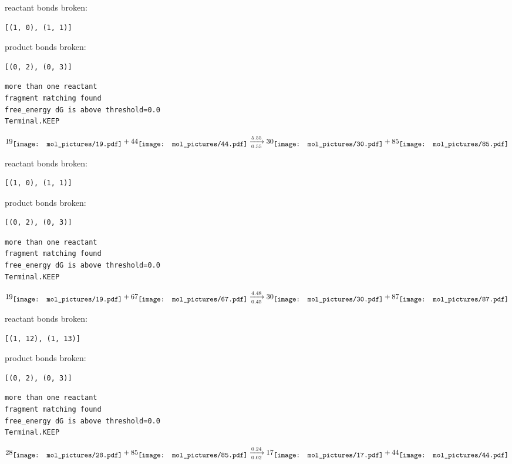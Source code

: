 \documentclass{article}
\begin{document}
reactant bonds broken:\begin{verbatim}
[(1, 0), (1, 1)]
\end{verbatim}
product bonds broken:\begin{verbatim}
[(0, 2), (0, 3)]
\end{verbatim}




\vspace{1cm}
\begin{verbatim}
more than one reactant
fragment matching found
free_energy dG is above threshold=0.0
Terminal.KEEP
\end{verbatim}
$$
19
\raisebox{-.5\height}{\texttt{[image: mol\_pictures/19.pdf]}}
+
44
\raisebox{-.5\height}{\texttt{[image: mol\_pictures/44.pdf]}}
\xrightarrow[0.55]{5.55}
30
\raisebox{-.5\height}{\texttt{[image: mol\_pictures/30.pdf]}}
+
85
\raisebox{-.5\height}{\texttt{[image: mol\_pictures/85.pdf]}}
$$


reactant bonds broken:\begin{verbatim}
[(1, 0), (1, 1)]
\end{verbatim}
product bonds broken:\begin{verbatim}
[(0, 2), (0, 3)]
\end{verbatim}




\vspace{1cm}
\begin{verbatim}
more than one reactant
fragment matching found
free_energy dG is above threshold=0.0
Terminal.KEEP
\end{verbatim}
$$
19
\raisebox{-.5\height}{\texttt{[image: mol\_pictures/19.pdf]}}
+
67
\raisebox{-.5\height}{\texttt{[image: mol\_pictures/67.pdf]}}
\xrightarrow[0.45]{4.48}
30
\raisebox{-.5\height}{\texttt{[image: mol\_pictures/30.pdf]}}
+
87
\raisebox{-.5\height}{\texttt{[image: mol\_pictures/87.pdf]}}
$$


reactant bonds broken:\begin{verbatim}
[(1, 12), (1, 13)]
\end{verbatim}
product bonds broken:\begin{verbatim}
[(0, 2), (0, 3)]
\end{verbatim}




\vspace{1cm}
\begin{verbatim}
more than one reactant
fragment matching found
free_energy dG is above threshold=0.0
Terminal.KEEP
\end{verbatim}
$$
28
\raisebox{-.5\height}{\texttt{[image: mol\_pictures/28.pdf]}}
+
85
\raisebox{-.5\height}{\texttt{[image: mol\_pictures/85.pdf]}}
\xrightarrow[0.02]{0.24}
17
\raisebox{-.5\height}{\texttt{[image: mol\_pictures/17.pdf]}}
+
44
\raisebox{-.5\height}{\texttt{[image: mol\_pictures/44.pdf]}}
$$
\end{document}
